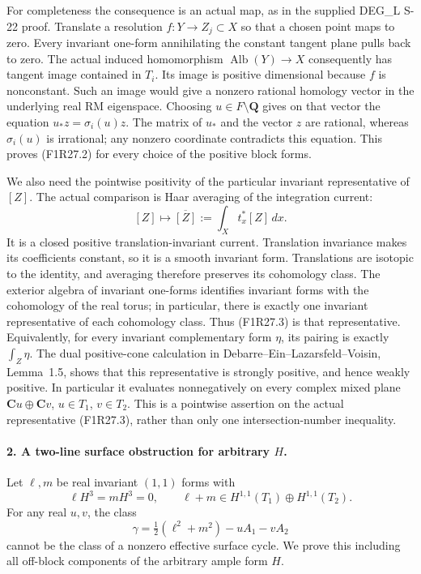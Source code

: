 For completeness the consequence is an actual
map, as in the supplied DEG\_L S-22 proof.
Translate a resolution $f:Y\to Z_j\subset X$
so that a chosen point maps to zero. Every
invariant one-form annihilating the constant
tangent plane pulls back to zero. The actual
induced homomorphism
$\operatorname{Alb}(Y)\to X$ consequently has
tangent image contained in $T_i$.
Its image is positive dimensional because $f$
is nonconstant. Such an image would give a
nonzero rational homology vector in the
underlying real RM eigenspace. Choosing
$u\in F\setminus\mathbf Q$ gives on that
vector the equation $u_*z=\sigma_i(u)z$.
The matrix of $u_*$ and the vector $z$ are
rational, whereas $\sigma_i(u)$ is irrational;
any nonzero coordinate contradicts this
equation. This proves (F1R27.2) for every
choice of the positive block forms.

We also need the pointwise positivity of the
particular invariant representative of $[Z]$.
The actual comparison is Haar averaging of the
integration current:
\[
               [Z]\longmapsto
                 \overline{[Z]}:=\int_X t_x^*[Z]\,dx.
 \tag{F1R27.3}
\]
It is a closed positive translation-invariant
current. Translation invariance makes its
coefficients constant, so it is a smooth
invariant form. Translations are isotopic to
the identity, and averaging therefore preserves
its cohomology class. The exterior algebra
of invariant one-forms identifies invariant
forms with the cohomology of the real torus;
in particular, there is exactly one invariant
representative of each cohomology class.
Thus (F1R27.3) is that representative.
Equivalently, for every invariant complementary
form $\eta$, its pairing is exactly
$\int_Z\eta$. The dual positive-cone calculation
in Debarre--Ein--Lazarsfeld--Voisin, Lemma~1.5,
shows that this representative is strongly
positive, and hence weakly positive.
In particular it evaluates nonnegatively on
every complex mixed plane
$\mathbf Cu\oplus\mathbf Cv$, $u\in T_1$,
$v\in T_2$. This is a pointwise assertion on
the actual representative (F1R27.3), rather
than only one intersection-number inequality.

\paragraph{2. A two-line surface obstruction for arbitrary $H$.}
Let $\ell,m$ be real invariant $(1,1)$ forms
with
\[
       \ell H^3=mH^3=0,\qquad
       \ell+m\in H^{1,1}(T_1)\oplus H^{1,1}(T_2).
 \tag{F1R27.4}
\]
For any real $u,v$, the class
\[
              \gamma=\tfrac12(\ell^2+m^2)-uA_1-vA_2
 \tag{F1R27.5}
\]
cannot be the class of a nonzero effective
surface cycle. We prove this including all
off-block components of the arbitrary ample
form $H$.


